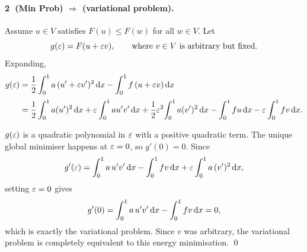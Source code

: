 
\paragraph{\textcircled{\scriptsize2} (Min Prob) $\Rightarrow$ (variational problem).}

Assume $u\in V$ satisfies $F(u)\le F(w)$ for all $w\in V$. Let
\begin{equation}
  g(\varepsilon) = F(u+\varepsilon v),
  \qquad\text{where } v\in V \text{ is arbitrary but fixed.}
\end{equation}
Expanding,
\begin{align}
  g(\varepsilon) &= \frac12\int_{0}^{1} a\,(u'+\varepsilon v')^{2}\,\mathrm{d} x
             - \int_{0}^{1} f\,(u+\varepsilon v)\,\mathrm{d} x \notag\\[2pt]
    &= \frac12\int_{0}^{1} a(u')^{2}\,\mathrm{d} x
     + \varepsilon\int_{0}^{1} a u'v'\,\mathrm{d} x
     + \frac12\varepsilon^{2}\!\int_{0}^{1} a(v')^{2}\,\mathrm{d} x
     - \int_{0}^{1} f u\,\mathrm{d} x
     - \varepsilon\int_{0}^{1} f v\,\mathrm{d} x .
\end{align}

\noindent
$g(\varepsilon)$ is a quadratic polynomial in $\varepsilon$ with a positive quadratic term.
The unique global minimiser happens at $\varepsilon=0$, so $g'(0)=0$. Since
\begin{equation}\label{eq:gprime}
  g'(\varepsilon) = \int_{0}^{1} a\,u'v'\,\mathrm{d} x - \int_{0}^{1} f v\,\mathrm{d} x
             + \varepsilon\int_{0}^{1} a\,(v')^{2}\,\mathrm{d} x,
\end{equation}
setting $\varepsilon=0$ gives
\begin{equation}
  g'(0) = \int_{0}^{1} a\,u'v'\,\mathrm{d} x - \int_{0}^{1} f v\,\mathrm{d} x = 0,
\end{equation}
which is exactly the variational problem. Since $v$ was arbitrary, the
variational problem is completely equivalent to this energy minimisation.
\qed


